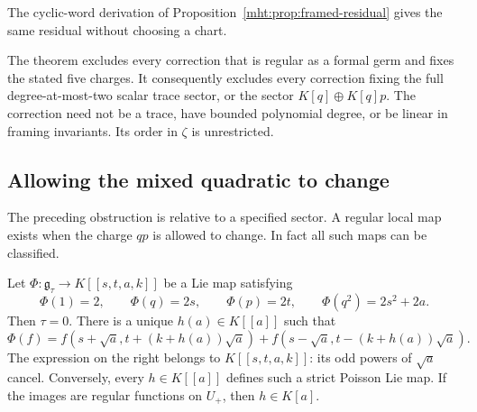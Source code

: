 The cyclic-word derivation of Proposition~\ref{mht:prop:framed-residual}
gives the same residual without choosing a chart.

The theorem excludes every correction that is regular as a formal germ
and fixes the stated five charges. It consequently excludes every
correction fixing the full degree-at-most-two scalar trace sector, or
the sector $K[q]\oplus K[q]p$. The correction need not be a trace, have bounded polynomial degree,
or be linear in framing invariants. Its order in $\zeta$ is unrestricted.

\subsection{Allowing the mixed quadratic to change}
\label{mht:frgl:sec:local-positive}

The preceding obstruction is relative to a specified sector. A regular
local map exists when the charge $qp$ is allowed to change. In fact all
such maps can be classified.

\begin{theorem}
\label{mht:frgl:thm:four-charge}
Let $\Phi:\mathfrak g_\tau\to K[[s,t,a,k]]$ be a Lie map satisfying
\[
 \Phi(1)=2,\qquad\Phi(q)=2s,\qquad\Phi(p)=2t,
 \qquad\Phi(q^2)=2s^2+2a.
\]
Then $\tau=0$. There is a unique $h(a)\in K[[a]]$ such that
\begin{equation}\label{mht:frgl:eq:positive-map}
 \Phi(f)=f(s+\sqrt a,t+(k+h(a))\sqrt a)
          +f(s-\sqrt a,t-(k+h(a))\sqrt a).
\end{equation}
The expression on the right belongs to $K[[s,t,a,k]]$: its odd powers
of $\sqrt a$ cancel. Conversely, every $h\in K[[a]]$ defines such a
strict Poisson Lie map. If the images are regular functions on $U_+$,
then $h\in K[a]$.
\end{theorem}

